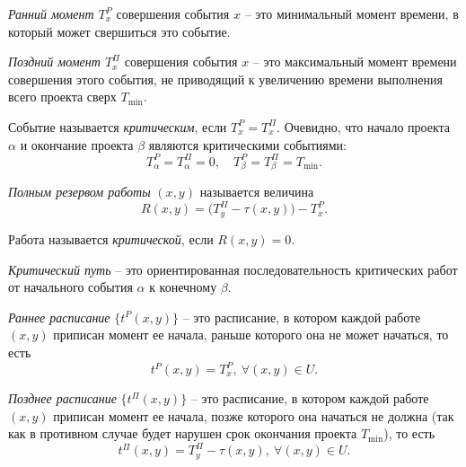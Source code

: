 \begin{definition}
  \emph{Ранний момент $T_{x}^{P} $} совершения события $x$ -- это минимальный момент времени, в который может свершиться это событие.
\end{definition}

\begin{definition}
  \emph{Поздний момент $T_{x}^{\Pi} $} совершения события $x$ -- это максимальный момент времени совершения этого события, не приводящий к увеличению времени выполнения всего проекта сверх $T_{\min} $. 
\end{definition}

\begin{definition}
  Событие называется \emph{критическим}, если $T_{x}^{P}= T_{x}^{\Pi} $. Очевидно, что начало проекта $\alpha $ и окончание проекта $\beta $ являются критическими событиями:
  \[
    T_{\alpha }^{P} = T_{\alpha }^{\Pi} = 0, \quad T_{\beta }^{P}  = T_{\beta }^{\Pi}  = T_{\min} . 
  \]
\end{definition}

\begin{definition}
  \emph{Полным резервом работы} $(x,y)$ называется величина
  \[
    R(x,y) = \big(T_{y}^{\Pi} - \tau (x,y)\big) - T_{x}^{P} .
  \]

  Работа называется \emph{критической}, если $R(x,y) = 0$.
\end{definition}

\begin{definition}
  \emph{Критический путь} -- это ориентированная последовательность критических работ от начального события $\alpha $ к конечному $\beta $.
\end{definition}

\begin{definition}
  \emph{Раннее расписание} $\big\{t^P(x,y)\big\}$ -- это расписание, в котором каждой работе $(x,y)$ приписан момент ее начала, раньше которого она не может начаться, то есть
  \[
    t^P(x,y) = T_{x}^{P} , \ \forall (x,y) \in U.
  \]
\end{definition}

\begin{definition}
  \emph{Позднее расписание} $\big\{t^\Pi(x,y)\big\}$ -- это расписание, в котором каждой работе $(x,y)$ приписан момент ее начала, позже которого она начаться не должна (так как в противном случае будет нарушен срок окончания проекта $T_{\min} $), то есть
  \[
    t^\Pi(x,y) = T_{y}^{\Pi} - \tau (x,y), \ \forall (x,y) \in U. 
  \]
\end{definition}
